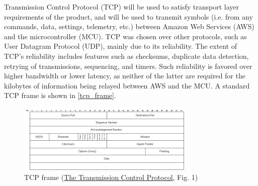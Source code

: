\begin{flushleft}
    Transmission Control Protocol (TCP) will be used to satisfy transport layer
    requirements of the product, and will be used to transmit symbols (i.e.
    from any commands, data, settings, telemetry, etc.) between Amazon Web
    Services (AWS) and the microcontroller (MCU). TCP was chosen over other
    protocols, such as User Datagram Protocol (UDP), mainly due to its
    reliability. The extent of TCP's reliability includes features such as
    checksums, duplicate data detection, retrying of transmissions, sequencing,
    and timers.
    Such reliability is favored over higher bandwidth or lower
    latency, as neither of the latter are required for the kilobytes
    of information being relayed between AWS and the MCU. A standard TCP frame
    is shown in \autoref{tcp_frame}.
    \begin{figure}[H]
        \caption{TCP frame (\href{https://condor.depaul.edu/jkristof/technotes/tcp.html}{The Transmission Control Protocol}, Fig. 1)}
        \label{tcp_frame}
        \centering
        \includegraphics[width=0.75\textwidth]{images/tcp_frame.jpg}
    \end{figure}
\end{flushleft}
